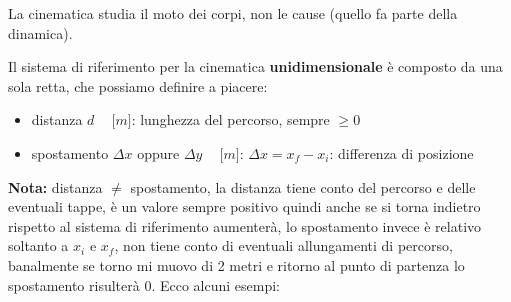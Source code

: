 \documentclass[../main.tex]{subfiles}
\begin{document}
La cinematica studia il moto dei corpi, non le cause (quello fa parte della dinamica).

Il sistema di riferimento per la cinematica \textbf{unidimensionale} è composto da una sola retta, che possiamo definire a piacere:
\begin{center}
\end{center}

\begin{itemize}
    \item distanza $d \phantom{-} \lbrack m \rbrack$: lunghezza del percorso, sempre $\geq 0$
    \item spostamento $\Delta x$ oppure $\Delta y \phantom{-} \lbrack m\rbrack$: $\Delta x=x_f-x_i$: differenza di posizione
\end{itemize}
\textbf{Nota:} distanza $\neq$ spostamento, la distanza tiene conto del percorso e delle eventuali tappe, è un valore sempre positivo quindi anche se si torna indietro rispetto al sistema di riferimento aumenterà, lo spostamento invece è relativo soltanto a $x_i$ e $x_f$, non tiene conto di eventuali allungamenti di percorso, banalmente se torno mi muovo di 2 metri e ritorno al punto di partenza lo spostamento risulterà 0. Ecco alcuni esempi: \\ \\
\end{document}
